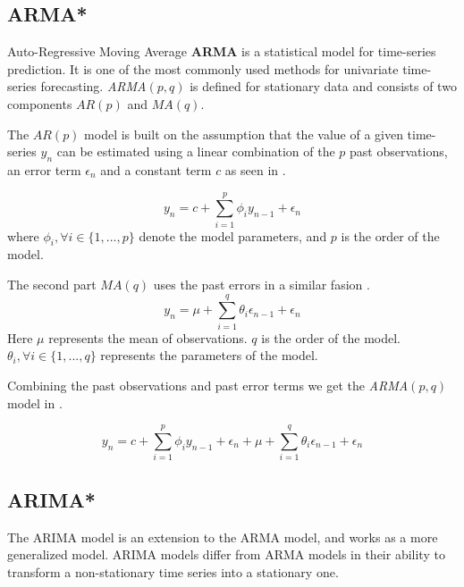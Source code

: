 
\subsection{ARMA*}

Auto-Regressive Moving Average \textbf{ARMA} is a statistical model for time-series prediction.
It is one of the most commonly used methods for univariate time-series forecasting.
\textit{ARMA}$(p, q)$ is defined for stationary data and consists of two components $AR(p)$ and $MA(q)$.

The $AR(p)$ model is built on the assumption that the value of a given time-series $y_n$ can be estimated using a linear combination
of the $p$ past observations, an error term $\epsilon_n$ and a constant term $c$ as seen in  \citep{Box2016}.

\begin{equation}
  \label{eq:arma_ar(p)}
  y_n = c + \sum_{i=1}^{p} \phi_i y_{n-1} + \epsilon_n
\end{equation}
where $\phi_i, \forall i \in \{1, ..., p\} $ denote the model parameters, and $p$ is the order of the model.

The second part $MA(q)$ uses the past errors in a similar fasion .
\begin{equation}
  \label{eq_arma_ma(q)}
  y_n = \mu + \sum_{i=1}^{q} \theta_i \epsilon_{n-1} + \epsilon_n
\end{equation}
Here $\mu$ represents the mean of observations. $q$ is the order of the model. $\theta_i, \forall i \in \{1, ..., q\}$ represents the parameters of the model.

Combining the past observations  and past error terms  we get the \textit{ARMA}$(p,q)$ model in .

\begin{equation}
  \label{eq:arma}
  y_n = c + \sum_{i=1}^{p} \phi_i y_{n-1} + \epsilon_n + \mu + \sum_{i=1}^{q} \theta_i \epsilon_{n-1} + \epsilon_n
\end{equation}


\subsection{ARIMA*}
The ARIMA model is an extension to the ARMA model, and works as a more generalized model.
ARIMA models differ from ARMA models in their ability to transform a non-stationary time series into a stationary one.

